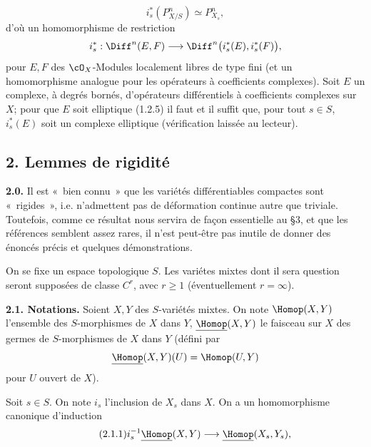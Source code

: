 \[
  i_s^*(P^n_{X/S})\simeq P^n_{X_s},
\]
d'où un
homomorphisme de restriction
\[
  i_s^*:\Diff^n(E,F)
  \longrightarrow
  \Diff^n\bigl(i_s^*(E),i_s^*(F)\bigr),
\]
pour $E,F$ des $\cO_X$-Modules localement libres de type fini (et un homomorphisme analogue pour les opérateurs à coefficients complexes). Soit $E$ un complexe, à degrés bornés, d'opérateurs différentiels à coefficients complexes sur $X$; pour que $E$ soit elliptique (1.2.5) il faut et il suffit que, pour tout $s\in S$, $i_s^*(E)$ soit un complexe elliptique (vérification laissée au lecteur).

\subsection*{2. Lemmes de rigidité}

\textbf{2.0.} Il est «~bien connu~» que les variétés différentiables compactes sont «~rigides~», i.e. n'admettent pas de déformation continue autre que triviale. Toutefois, comme ce résultat nous servira de façon essentielle au §3, et que les références semblent assez rares, il n'est peut-être pas inutile de donner des énoncés précis et quelques démonstrations.

On se fixe un espace topologique $S$. Les variétes mixtes dont il sera question seront supposées de classe $C^r$, avec $r\ge1$ (éventuellement $r=\infty$).

\textbf{2.1. Notations.} Soient $X,Y$ des $S$-variétés mixtes. On note $\Homop(X,Y)$ l'ensemble des $S$-morphismes de $X$ dans $Y$, $\underline{\Homop}(X,Y)$ le faisceau sur $X$ des germes de $S$-morphismes de $X$ dans $Y$ (défini par
\[
  \underline{\Homop}(X,Y)(U)=\Homop(U,Y)
\]
pour $U$ ouvert de $X$).

Soit $s\in S$. On note $i_s$ l'inclusion de $X_s$ dans $X$. On a un homomorphisme canonique d'induction
\begin{equation}\tag{2.1.1}
  i_s^{-1}\underline{\Homop}(X,Y)
  \longrightarrow
  \underline{\Homop}(X_s,Y_s),
\end{equation}
